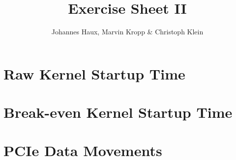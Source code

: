 \documentclass[DIV=12,oneside,a4paper]{scrartcl}
\begin{document}

\title{Exercise Sheet II}
\author{Johannes Haux, Marvin Kropp \& Christoph Klein}
\maketitle

\section{Raw Kernel Startup Time}

\section{Break-even Kernel Startup Time}

\section{PCIe Data Movements}
\end{document}
